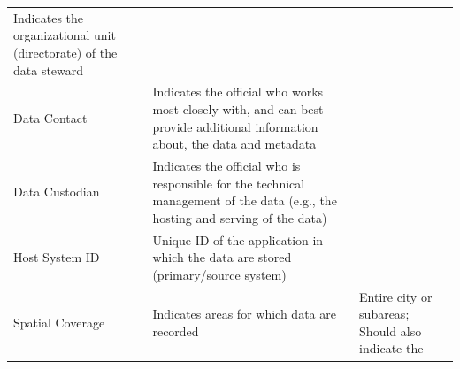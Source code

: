 \documentclass[
]{book}
\begin{document}
\begin{longtable}[]{@{}lll@{}}
\begin{minipage}[t]{0.35\columnwidth}
Indicates the
organizational unit
(directorate) of the data
steward\strut
\end{minipage} & \begin{minipage}[t]{0.35\columnwidth}\raggedright
\strut
\end{minipage}\tabularnewline
\begin{minipage}[t]{0.22\columnwidth}\raggedright
Data Contact\strut
\end{minipage} & \begin{minipage}[t]{0.35\columnwidth}\raggedright
Indicates the official
who works most closely
with, and can best
provide additional
information about, the
data and metadata\strut
\end{minipage} & \begin{minipage}[t]{0.35\columnwidth}\raggedright
\strut
\end{minipage}\tabularnewline
\begin{minipage}[t]{0.22\columnwidth}\raggedright
Data Custodian\strut
\end{minipage} & \begin{minipage}[t]{0.35\columnwidth}\raggedright
Indicates the official
who is responsible for
the technical management
of the data (e.g., the
hosting and serving of
the data)\strut
\end{minipage} & \begin{minipage}[t]{0.35\columnwidth}\raggedright
\strut
\end{minipage}\tabularnewline
\begin{minipage}[t]{0.22\columnwidth}\raggedright
Host System ID\strut
\end{minipage} & \begin{minipage}[t]{0.35\columnwidth}\raggedright
Unique ID of the
application in which the
data are stored
(primary/source system)\strut
\end{minipage} & \begin{minipage}[t]{0.35\columnwidth}\raggedright
\strut
\end{minipage}\tabularnewline
\begin{minipage}[t]{0.22\columnwidth}\raggedright
Spatial
Coverage\strut
\end{minipage} & \begin{minipage}[t]{0.35\columnwidth}\raggedright
Indicates areas for which
data are recorded\strut
\end{minipage} & \begin{minipage}[t]{0.35\columnwidth}\raggedright
Entire city or subareas;
Should also indicate the

\end{minipage}
\end{longtable}
\end{document}
